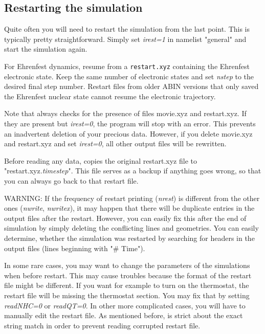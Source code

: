 \subsection{Restarting the simulation}

Quite often you will need to restart the simulation from the last point. This is typically pretty straightforward. Simply set \textit{irest=1} in namelist "general" and start the simulation again. 

For Ehrenfest dynamics, resume from a \texttt{restart.xyz} containing the Ehrenfest electronic state. Keep the same number of electronic states and set \textit{nstep} to the desired final step number. Restart files from older ABIN versions that only saved the Ehrenfest nuclear state cannot resume the electronic trajectory.

Note that \abin always checks for the presence of files movie.xyz and restart.xyz. If they are present but \textit{irest=0}, the program will stop with an error. This prevents an inadvertent deletion of your precious data. However, if you delete movie.xyz and restart.xyz and set \textit{irest=0}, all other output files will be rewritten. 

Before reading any data, \abin copies the original restart.xyz file to "restart.xyz.\textit{timestep}". This file serves as a backup if anything goes wrong, so that you can always go back to that restart file. 

\medskip
WARNING: If the frequency of restart printing (\textit{nrest}) is different from the other ones (\textit{nwrite}, \textit{nwritex}), it may happen that there will be duplicate entries in the output files after the restart. However, you can easily fix this after the end of simulation by simply deleting the conflicting lines and geometries. You can easily determine, whether the simulation was restarted by searching for headers in the output files (lines beginning with "\# Time").

\medskip
In some rare cases, you may want to change the parameters of the simulations when before restart.
This may cause troubles because the format of the restart file might be different. If you want for example to turn on the thermostat, the restart file will be missing the thermostat section. You may fix that by setting \textit{readNHC=0} or \textit{readQT=0}. In other more complicated cases, you will have to manually edit the restart file. As mentioned before, \abin is strict about the exact string match in order to prevent reading corrupted restart file.  

